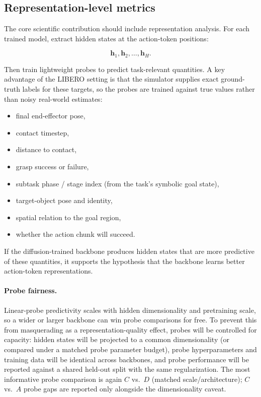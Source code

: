 \documentclass[11pt]{article}
\newcommand{\vect}[1]{\mathbf{#1}}
\begin{document}
\subsection{Representation-level metrics}

The core scientific contribution should include representation analysis. For each trained model, extract hidden states at the action-token positions:

\begin{equation}
    \vect{h}_1, \vect{h}_2, \ldots, \vect{h}_H.
\end{equation}

Then train lightweight probes to predict task-relevant quantities. A key advantage of the LIBERO setting is that the simulator supplies exact ground-truth labels for these targets, so the probes are trained against true values rather than noisy real-world estimates:

\begin{itemize}
    \item final end-effector pose,
    \item contact timestep,
    \item distance to contact,
    \item grasp success or failure,
    \item subtask phase / stage index (from the task's symbolic goal state),
    \item target-object pose and identity,
    \item spatial relation to the goal region,
    \item whether the action chunk will succeed.
\end{itemize}

If the diffusion-trained backbone produces hidden states that are more predictive of these quantities, it supports the hypothesis that the backbone learns better action-token representations.

\paragraph{Probe fairness.} Linear-probe predictivity scales with hidden dimensionality and pretraining scale, so a wider or larger backbone can win probe comparisons for free. To prevent this from masquerading as a representation-quality effect, probes will be controlled for capacity: hidden states will be projected to a common dimensionality (or compared under a matched probe parameter budget), probe hyperparameters and training data will be identical across backbones, and probe performance will be reported against a shared held-out split with the same regularization. The most informative probe comparison is again $C$ vs.\ $D$ (matched scale/architecture); $C$ vs.\ $A$ probe gaps are reported only alongside the dimensionality caveat.
\end{document}
